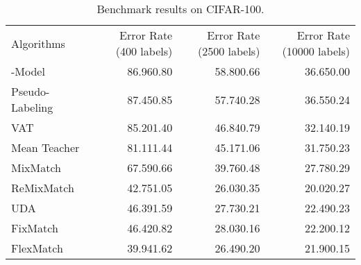 \begin{table}[h!]
\centering
\caption{Benchmark results on CIFAR-100.}
\label{tb-benchmark-cifar100}
\begin{adjustbox}{width=\columnwidth,center}

\begin{tabular}{lrrr}
\toprule
Algorithms & Error Rate (400 labels) & Error Rate (2500 labels) & Error Rate (10000 labels) \\  \cmidrule(r){1-1} \cmidrule(l){2-2} \cmidrule(l){3-3} \cmidrule(l){4-4}
-Model~\citep{rasmus2015semi}    &86.96{\scriptsize 0.80}  &58.80{\scriptsize 0.66} &36.65{\scriptsize 0.00}   \\ 

Pseudo-Labeling~\citep{lee2013pseudo}     & 87.45{\scriptsize 0.85}  & 57.74{\scriptsize 0.28}   & 36.55{\scriptsize 0.24}   \\

VAT~\citep{miyato2018virtual} &85.20{\scriptsize 1.40}  &46.84{\scriptsize 0.79} &32.14{\scriptsize 0.19}  \\

Mean Teacher\citep{tarvainen2017mean}  &81.11{\scriptsize 1.44} &45.17{\scriptsize 1.06} &31.75{\scriptsize 0.23}   \\ 

MixMatch~\citep{berthelot2019mixmatch}    &67.59{\scriptsize 0.66} &39.76{\scriptsize 0.48}  &27.78{\scriptsize 0.29}  \\ 

ReMixMatch~\citep{berthelot2019remixmatch}    &42.75{\scriptsize 1.05} &26.03{\scriptsize 0.35} &20.02{\scriptsize 0.27}    \\

UDA~\citep{xie2020unsupervised}      &46.39{\scriptsize 1.59} & 27.73{\scriptsize 0.21} & 22.49{\scriptsize 0.23}         \\

FixMatch~\citep{sohn2020fixmatch}    & 46.42{\scriptsize 0.82}   & 28.03{\scriptsize 0.16} &22.20{\scriptsize 0.12}  \\
FlexMatch           & 39.94{\scriptsize 1.62}  & 26.49{\scriptsize 0.20}  & 21.90{\scriptsize 0.15}      \\ \bottomrule
\end{tabular}
\end{adjustbox}
\end{table}

